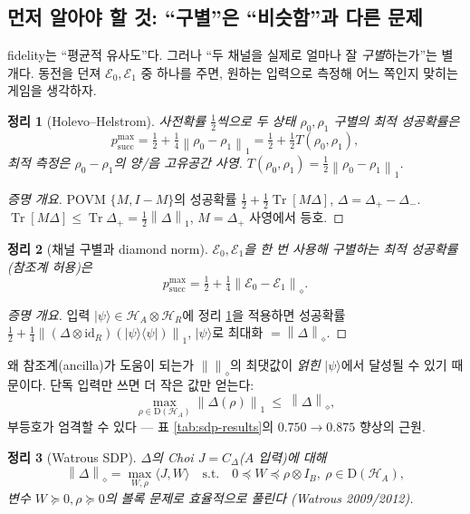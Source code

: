 \documentclass[11pt,a4paper]{article}
\newcommand{\E}{\mathcal{E}}
\newcommand{\Hcal}{\mathcal{H}}
\newcommand{\Tr}{\operatorname{Tr}}
\newcommand{\id}{\mathrm{id}}
\newcommand{\Dens}{\mathrm{D}}
\newcommand{\diamondnorm}[1]{\left\lVert #1 \right\rVert_{\diamond}}
\newcommand{\onenorm}[1]{\left\lVert #1 \right\rVert_{1}}
\theoremstyle{definition}
\theoremstyle{plain}
\newtheorem{theorem}{정리}[section]
\theoremstyle{remark}
\begin{document}
\subsection{먼저 알아야 할 것: ``구별''은 ``비슷함''과 다른 문제}

fidelity는 ``평균적 유사도''다. 그러나 ``두 채널을 실제로 얼마나 잘 \emph{구별}하는가''는 별개다. 동전을 던져 $\E_0,\E_1$ 중 하나를 주면, 원하는 입력으로 측정해 어느 쪽인지 맞히는 게임을 생각하자.

\begin{theorem}[Holevo--Helstrom]\label{thm:helstrom}
사전확률 $\tfrac12$씩으로 두 상태 $\rho_0,\rho_1$ 구별의 최적 성공확률은
\[
p_{\mathrm{succ}}^{\max}=\tfrac12+\tfrac14\onenorm{\rho_0-\rho_1}=\tfrac12+\tfrac12T(\rho_0,\rho_1),
\]
최적 측정은 $\rho_0-\rho_1$의 양/음 고유공간 사영. $T(\rho_0,\rho_1)=\tfrac12\onenorm{\rho_0-\rho_1}$.
\end{theorem}
\begin{proof}[증명 개요]
POVM $\{M,I-M\}$의 성공확률 $\tfrac12+\tfrac12\Tr[M\Delta]$, $\Delta=\Delta_+-\Delta_-$. $\Tr[M\Delta]\le\Tr\Delta_+=\tfrac12\onenorm\Delta$, $M=\Delta_+$ 사영에서 등호.
\end{proof}

\begin{theorem}[채널 구별과 diamond norm]\label{thm:chandisc}
$\E_0,\E_1$을 한 번 사용해 구별하는 최적 성공확률(참조계 허용)은
\[
\boxed{p_{\mathrm{succ}}^{\max}=\tfrac12+\tfrac14\diamondnorm{\E_0-\E_1}.}
\]
\end{theorem}
\begin{proof}[증명 개요]
입력 $|\psi\rangle\in\Hcal_A\otimes\Hcal_R$에 정리 \ref{thm:helstrom}을 적용하면 성공확률 $\tfrac12+\tfrac14\onenorm{(\Delta\otimes\id_R)(|\psi\rangle\langle\psi|)}$, $|\psi\rangle$로 최대화 $=\diamondnorm\Delta$.
\end{proof}

\begin{mathbox}{왜 참조계(ancilla)가 도움이 되는가}
$\diamondnorm{}$의 최댓값이 \emph{얽힌} $|\psi\rangle$에서 달성될 수 있기 때문이다. 단독 입력만 쓰면 더 작은 값만 얻는다:
\[
\max_{\rho\in\Dens(\Hcal_A)}\onenorm{\Delta(\rho)}\ \le\ \diamondnorm{\Delta},
\]
부등호가 엄격할 수 있다 --- 표 \ref{tab:sdp-results}의 $0.750\to0.875$ 향상의 근원.
\end{mathbox}

\begin{theorem}[Watrous SDP]\label{thm:sdp}
$\Delta$의 Choi $J=C_\Delta$($A$ 입력)에 대해
\[
\diamondnorm{\Delta}=\max_{W,\rho}\langle J,W\rangle\quad\text{s.t.}\quad0\preceq W\preceq\rho\otimes I_B,\ \rho\in\Dens(\Hcal_A),
\]
변수 $W\succeq0,\rho\succeq0$의 볼록 문제로 효율적으로 풀린다 (Watrous 2009/2012).
\end{theorem}
\end{document}
